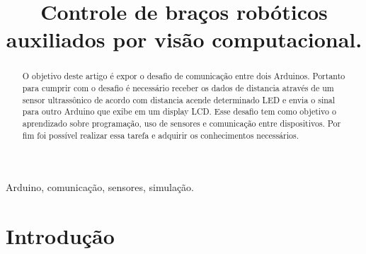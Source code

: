 \documentclass[conference]{IEEEtran}
\begin{document}
\title{Controle de braços robóticos auxiliados por visão computacional.
}



\author{
\and
{}
}

\maketitle

\begin{abstract}
O objetivo deste artigo é expor o desafio de comunicação entre dois Arduinos. Portanto para cumprir com o desafio é necessário receber os dados de distancia através de um sensor ultrassônico de acordo com distancia acende determinado LED e envia o sinal para outro Arduino que exibe em um display LCD. Esse desafio tem como objetivo o aprendizado sobre programação, uso de sensores e comunicação entre dispositivos. Por fim foi possível realizar essa tarefa e adquirir os conhecimentos necessários.

\end{abstract}

\begin{IEEEkeywords}
Arduino, comunicação, sensores, simulação.
\end{IEEEkeywords}

\section{Introdução}
\end{document}
